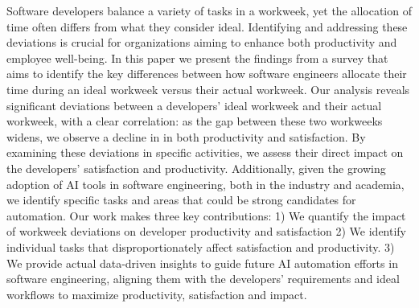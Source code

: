 Software developers balance a variety of tasks in a workweek, yet the allocation of time often differs from what they consider ideal. Identifying and addressing these deviations is crucial for organizations aiming to enhance both productivity and employee well-being.
In this paper we present the findings from a survey that aims to identify the key differences between how software engineers allocate their time during an ideal workweek versus their actual workweek. Our analysis reveals significant deviations between a developers' ideal workweek and their actual workweek, with a clear correlation: as the gap between these two workweeks widens, we observe a decline in in both productivity and satisfaction. By examining these deviations in specific activities, we assess their direct impact on the developers' satisfaction and productivity. Additionally, given the growing adoption of AI tools in software engineering, both in the industry and academia, we identify specific tasks and areas that could be strong candidates for automation. 
Our work makes three key contributions: 1) We quantify the impact of workweek deviations on developer productivity and satisfaction 2) We identify individual tasks that disproportionately affect satisfaction and productivity. 3) We provide actual data-driven insights to guide future AI automation efforts in software engineering, aligning them with the developers' requirements and ideal workflows to maximize productivity, satisfaction and impact.  